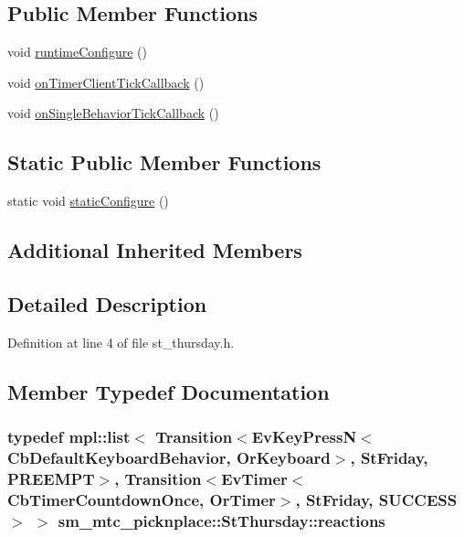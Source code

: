 \subsection*{Public Member Functions}
\begin{DoxyCompactItemize}
\item 
void \hyperlink{structsm__mtc__picknplace_1_1StThursday_ad1580aa352cac9cec29dc7c1604ea43d}{runtime\+Configure} ()
\item 
void \hyperlink{structsm__mtc__picknplace_1_1StThursday_ae0c4b1ceee145cde98b5ebb458611478}{on\+Timer\+Client\+Tick\+Callback} ()
\item 
void \hyperlink{structsm__mtc__picknplace_1_1StThursday_a034633481145f6f1788473d9b9a3801c}{on\+Single\+Behavior\+Tick\+Callback} ()
\end{DoxyCompactItemize}
\subsection*{Static Public Member Functions}
\begin{DoxyCompactItemize}
\item 
static void \hyperlink{structsm__mtc__picknplace_1_1StThursday_a6194782782af61615a9b505c7f12a60e}{static\+Configure} ()
\end{DoxyCompactItemize}
\subsection*{Additional Inherited Members}


\subsection{Detailed Description}


Definition at line 4 of file st\+\_\+thursday.\+h.



\subsection{Member Typedef Documentation}
\subsubsection[{\texorpdfstring{reactions}{reactions}}]{\setlength{\rightskip}{0pt plus 5cm}typedef mpl\+::list$<$ Transition$<$Ev\+Key\+PressN$<$Cb\+Default\+Keyboard\+Behavior, {\bf Or\+Keyboard}$>$, {\bf St\+Friday}, {\bf P\+R\+E\+E\+M\+PT}$>$, Transition$<$Ev\+Timer$<$Cb\+Timer\+Countdown\+Once, {\bf Or\+Timer}$>$, {\bf St\+Friday}, {\bf S\+U\+C\+C\+E\+SS}$>$ $>$ {\bf sm\+\_\+mtc\+\_\+picknplace\+::\+St\+Thursday\+::reactions}}\hypertarget{structsm__mtc__picknplace_1_1StThursday_a2014e5f1e4bfb30e1bea12d98b51b9f8}{}\label{structsm__mtc__picknplace_1_1StThursday_a2014e5f1e4bfb30e1bea12d98b51b9f8}


